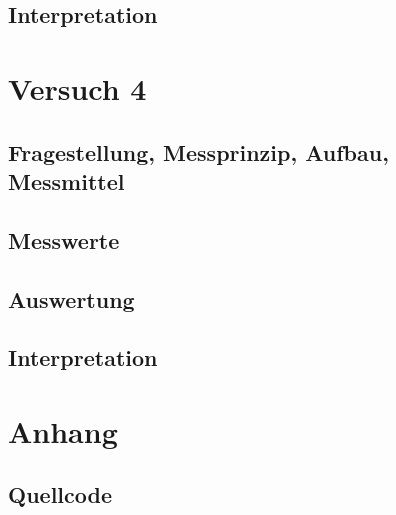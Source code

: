 \documentclass[12pt, oneside, a4paper, \docLanguage]{report}
\begin{document}
\section{Interpretation}
\label{chap:VERSUCH_3_INTERPRETATION}

%
%
\chapter{Versuch 4}
\label{chap:VERSUCH_4}

\section{Fragestellung, Messprinzip, Aufbau, Messmittel}
\label{chap:VERSUCH_4_FRAGESTELLUNG}

\section{Messwerte}
\label{chap:VERSUCH_4_MESSWERTE}

\section{Auswertung}
\label{chap:VERSUCH_4_AUSWERTUNG}

\section{Interpretation}
\label{chap:VERSUCH_4_INTERPRETATION}
%
%
\renewcommand\thesection{A.\arabic{section}}
\renewcommand\thesubsection{\thesection.\arabic{subsection}}

\chapter*{Anhang}
\label{chap:APPENDIX}
\addtocounter{chapter}{1}
\setcounter{section}{0}

\section{Quellcode}
\label{chap:APPENDIX_SOURCECODE}
\end{document}

